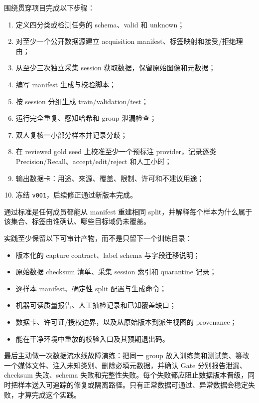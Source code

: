 围绕贯穿项目完成以下步骤：

\begin{enumerate}
  \item 定义四分类或检测任务的 schema、valid 和 unknown；
  \item 对至少一个公开数据源建立 acquisition manifest、标签映射和接受/拒绝理由；
  \item 从至少三次独立采集 session 获取数据，保留原始图像和元数据；
  \item 编写 manifest 生成与校验脚本；
  \item 按 session 分组生成 train/validation/test；
  \item 运行完全重复、感知哈希和 group 泄漏检查；
  \item 双人复核一小部分样本并记录分歧；
  \item 在 reviewed gold seed 上校准至少一个预标注 provider，记录逐类 Precision/Recall、accept/edit/reject 和人工小时；
  \item 输出数据卡：用途、来源、覆盖、限制、许可和不建议用途；
  \item 冻结 \texttt{v001}，后续修正通过新版本完成。
\end{enumerate}

通过标准是任何成员都能从 manifest 重建相同 split，并解释每个样本为什么属于该集合、标签由谁确认、哪些目标域仍未覆盖。

实践至少保留以下可审计产物，而不是只留下一个训练目录：

\begin{itemize}
  \item 版本化的 capture contract、label schema 与字段迁移说明；
  \item 原始数据 checksum 清单、采集 session 索引和 quarantine 记录；
  \item 逐样本 manifest、确定性 split 配置与生成命令；
  \item 机器可读质量报告、人工抽检记录和已知覆盖缺口；
  \item 数据卡、许可证/授权边界，以及从原始版本到派生视图的 provenance；
  \item 能在干净环境中重放的校验入口及其预期退出码。
\end{itemize}

最后主动做一次数据流水线故障演练：把同一 group 放入训练集和测试集、篡改一个媒体文件、注入未知类别、删除必填元数据，并确认 Gate 分别报告泄漏、checksum 失败、schema 失败和完整性失败。每个失败都应阻止数据版本晋级，同时把样本送入可追踪的修复或隔离路径。只有正常数据可通过、异常数据会稳定失败，才算完成这个实践。
